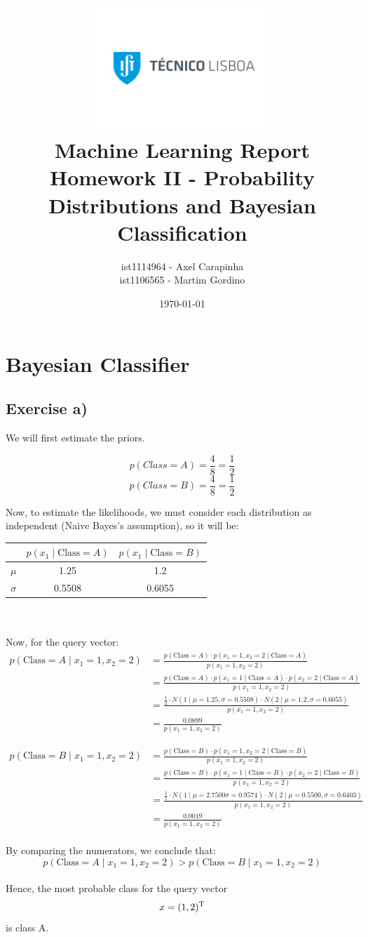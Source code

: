 \documentclass{article}
\title{
\includegraphics[width=0.5\textwidth]{ist-logo.jpg}\\[1ex] %
Machine Learning Report \\ 
\large Homework II - Probability Distributions and Bayesian Classification
}
\author{ist1114964 - Axel Carapinha \\ ist1106565 - Martim Gordino}
\date{\today}
\begin{document}
\maketitle
\tableofcontents
\newpage

\section{Bayesian Classifier}
\subsection{Exercise a)}
We will first estimate the priors.

$$p(Class = A) = \frac{4}{8} = \frac{1}{2}$$
$$p(Class = B) = \frac{4}{8} = \frac{1}{2}$$

Now, to estimate the likelihoods, we must consider each distribution as independent (Naive Bayes's assumption), so it will be:
\\
\begin{tabular}{|c|c|c|}
    \hline
    & \( p(x_1 \mid \text{Class} = A) \) & \( p(x_1 \mid \text{Class} = B) \) \\ 
    \hline
    \( \mu \) & 1.25 & 1.2 \\
    \hline
    \( \sigma \) & 0.5508 & 0.6055 \\
    \hline
\end{tabular}
\\
\\
Now, for the query vector:
\begin{align*}
    p(\text{Class} = A \mid x_1 = 1, x_2 = 2) 
    &= \frac{p(\text{Class} = A) \cdot p(x_1 = 1, x_2 = 2 \mid \text{Class} = A)}{p(x_1 = 1, x_2 = 2)} \\
    &= \frac{p(\text{Class} = A) \cdot p(x_1 = 1 \mid \text{Class} = A) \cdot p(x_2 = 2 \mid \text{Class} = A)}{p(x_1 = 1, x_2 = 2)} \\
    &= \frac{\frac{1}{2} \cdot N(1 \mid \mu = 1.25, \sigma = 0.5508) \cdot N(2 \mid \mu = 1.2, \sigma = 0.6055)}{p(x_1 = 1, x_2 = 2)} \\
    &= \frac{0.0899}{p(x_1 = 1, x_2 = 2)}
\end{align*}


\begin{align*}
    p(\text{Class} = B \mid x_1 = 1, x_2 = 2) 
    &= \frac{p(\text{Class} = B) \cdot p(x_1 = 1, x_2 = 2 \mid \text{Class} = B)}{p(x_1 = 1, x_2 = 2)} \\
    &= \frac{p(\text{Class} = B) \cdot p(x_1 = 1 \mid \text{Class} = B) \cdot p(x_2 = 2 \mid \text{Class} = B)}{p(x_1 = 1, x_2 = 2)} \\
    &= \frac{\frac{1}{2} \cdot N(1 \mid \mu = 2.7500\sigma = 0.9574) \cdot N(2 \mid \mu = 0.5500, \sigma = 0.6403)}{p(x_1 = 1, x_2 = 2)} \\
    &= \frac{0.0019}{p(x_1 = 1, x_2 = 2)}
\end{align*}
\\
By comparing the numerators, we conclude that:
$$p(\text{Class} = A \mid x_1 = 1, x_2 = 2) > p(\text{Class} = B \mid x_1 = 1, x_2 = 2)$$
\\
Hence, the most probable class for the query vector $$x = (1, 2)\textsuperscript{T}$$ is class A.
\newpage
\end{document}
